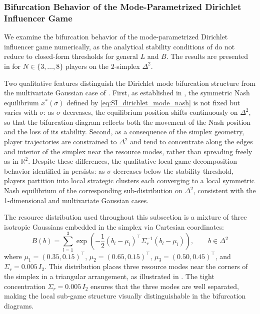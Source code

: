 \documentclass{article}
\begin{document}
    \subsubsection{Bifurcation Behavior of the Mode-Parametrized Dirichlet Influencer Game}\label{subsubsec:SI_dirichlet_mode_bifurcation}

        We examine the bifurcation behavior of the mode-parametrized Dirichlet influencer game numerically, as the analytical stability conditions of  do not reduce to closed-form thresholds for general $L$ and $B$. The results are presented in  for $N \in \{3,\ldots,8\}$ players on the 2-simplex $\Delta^2$.

        Two qualitative features distinguish the Dirichlet mode bifurcation structure from the multivariate Gaussian case of . First, as established in , the symmetric Nash equilibrium $x^*(\sigma)$ defined by \cref{eq:SI_dirichlet_mode_nash} is not fixed but varies with $\sigma$: as $\sigma$ decreases, the equilibrium position shifts continuously on $\Delta^2$, so that the bifurcation diagram reflects both the movement of the Nash position and the loss of its stability. Second, as a consequence of the simplex geometry, player trajectories are constrained to $\Delta^2$ and tend to concentrate along the edges and interior of the simplex near the resource modes, rather than spreading freely as in $\mathbb{R}^2$. Despite these differences, the qualitative local-game decomposition behavior identified in  persists: as $\sigma$ decreases below the stability threshold, players partition into local strategic clusters each converging to a local symmetric Nash equilibrium of the corresponding sub-distribution on $\Delta^2$, consistent with the 1-dimensional and multivariate Gaussian cases.

        The resource distribution used throughout this subsection is a mixture of three isotropic Gaussians embedded in the simplex via Cartesian coordinates:
        \begin{equation}
            \label{eq:SI_dirichlet_mode_resource}
            B(b) = \sum_{l=1}^{3}\exp\!\left(-\frac{1}{2}(b_l - \mu_l)^\top\Sigma_r^{-1}(b_l - \mu_l)\right),
            \qquad b \in \Delta^2
        \end{equation}
        where $\mu_1 = (0.35, 0.15)^\top$, $\mu_2 = (0.65, 0.15)^\top$, $\mu_3 = (0.50, 0.45)^\top$, and $\Sigma_r = 0.005\,I_2$.
        This distribution places three resource modes near the corners of the simplex in a triangular arrangement, as illustrated in . The tight concentration $\Sigma_r = 0.005\,I_2$ ensures that the three modes are well separated, making the local sub-game structure visually distinguishable in the bifurcation diagrams.
\end{document}
